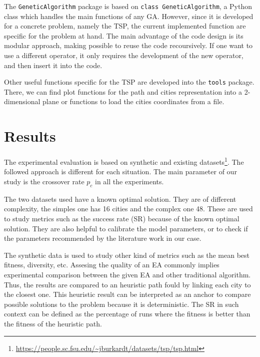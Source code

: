 \documentclass[10pt,a4paper]{article}
\begin{document}
The \texttt{GeneticAlgorithm} package is based on \texttt{class GeneticAlgorithm}, a Python class which handles the main functions of any GA. However, since it is developed for a concrete problem, namely the TSP, the current implemented function are specific for the problem at hand. The main advantage of the code design is its modular approach, making possible to reuse the code recoursively. If one want to use a different operator, it only requires the development of the new operator, and then insert it into the code.

Other useful functions specific for the TSP are developed into the \texttt{tools} package. There, we can find plot functions for the path and cities representation into a 2-dimensional plane or functions to load the cities coordinates from a file.

\section{Results}
The experimental evaluation is based on synthetic and existing datasets\footnote{\url{https://people.sc.fsu.edu/~jburkardt/datasets/tsp/tsp.html}}. The followed approach is different for each situation. The main parameter of our study is the crossover rate $p_c$ in all the experiments.

The two datasets used have a known optimal solution. They are of different complexity, the simples one has 16 cities and the complex one 48. These are used to study metrics such as the success rate (SR) because of the known optimal solution. They are also helpful to calibrate the model parameters, or to check if the parameters recommended by the literature work in our case.

The synthetic data is used to study other kind of metrics such as the mean best fitness, diversity, etc. Assesing the quality of an EA commonly implies experimental comparison between the given EA and other traditional algorithm. Thus, the results are compared to an heuristic path fould by linking each city to the closest one. This heuristic result can be interpreted as an anchor to compare possible solutions to the problem because it is deterministic. The SR in such context can be defined as the percentage of runs where the fitness is better than the fitness of the heuristic path.
\end{document}
